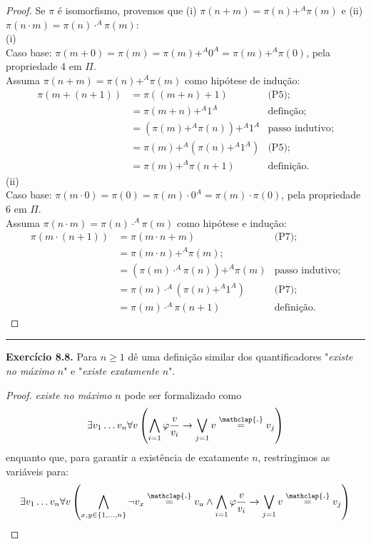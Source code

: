 \documentclass[11pt]{article}
\theoremstyle{definition}
\newcommand\overtext[2]{\stackrel{\mathclap{\normalfont\mbox{#1}}}{#2}}
\begin{document}
\begin{proof}
    Se $\pi$ é isomorfismo, provemos que (i) $\pi(n+m)=\pi(n)+^A\pi(m)$ e (ii) $\pi(n\cdot m)=\pi(n)\cdot^A\pi(m)$:\\
    (i)\\
    Caso base: $\pi(m+0)=\pi(m)=\pi(m)+^A0^A=\pi(m)+^A\pi(0)$, pela propriedade 4 em $\Pi$.\\
    Assuma $\pi(n+m)=\pi(n)+^A\pi(m)$ como hipótese de indução:
    \begin{align*}
        \pi(m+(n+1)) & = \pi((m + n) + 1) & \text{(P5)};\\
        & = \pi(m + n)+^A1^A & \text{definção};\\
        & = (\pi(m)+^A\pi(n))+^A1^A & \text{passo indutivo};\\
        & = \pi(m)+^A(\pi(n)+^A1^A) & \text{(P5)};\\
        & = \pi(m)+^A\pi(n+1) & \text{definição}.
    \end{align*}
    (ii)\\
    Caso base: $\pi(m\cdot0)=\pi(0)=\pi(m)\cdot0^A=\pi(m)\cdot\pi(0)$, pela propriedade 6 em $\Pi$.\\
    Assuma $\pi(n\cdot m)=\pi(n)\cdot^A\pi(m)$ como hipótese e indução:
    \begin{align*}
        \pi(m\cdot(n+1)) & = \pi(m\cdot n + m) & \text{(P7)};\\
        & = \pi(m\cdot n)+^A\pi(m); & \\
        & = (\pi(m)\cdot^A\pi(n))+^A\pi(m) & \text{passo indutivo};\\
        & = \pi(m)\cdot^A(\pi(n)+^A1^A) & \text{(P7)};\\
        & = \pi(m)\cdot^A\pi(n+1) & \text{definição}.
    \end{align*}
\end{proof}

\hrule

\textbf{Exercício 8.8.} Para $n\ge1$ dê uma definição similar dos quantificadores "\textit{existe no máximo} $n$" e "\textit{existe exatamente} $n$".

\begin{proof}
    \textit{existe no máximo} $n$ pode ser formalizado como
    $$\exists v_1\dots v_n\forall v\left(\bigwedge_{i=1}\varphi\frac{v}{v_i}\rightarrow\bigvee_{j=1}v\overtext{.}{=}v_j\right)$$
    enquanto que, para garantir a existência de exatamente $n$, restringimos as variáveis para:
    $$\exists v_1\dots v_n\forall v\left(\bigwedge_{x,y\in\{1,\dots,n\}}\neg v_x\overtext{.}{=}v_u\wedge\bigwedge_{i=1}\varphi\frac{v}{v_i}\rightarrow\bigvee_{j=1}v\overtext{.}{=}v_j\right)$$
\end{proof}
\end{document}
